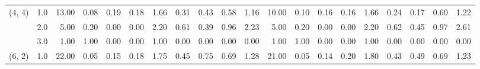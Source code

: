\begin{tabular}{llrrrrrrrrrrrrrrrrrr}
(4, 4) & 1.0 &              13.00 &                     0.08 &                                 0.19 &                             0.18 &                           1.66 &                                               0.31 &                                            0.43 &                                            0.58 &                                        1.16 &              10.00 &                     0.10 &                                 0.16 &                             0.16 &                           1.66 &                                               0.24 &                                            0.17 &                                            0.60 &                                        1.22 \\
       & 2.0 &               5.00 &                     0.20 &                                 0.00 &                             0.00 &                           2.20 &                                               0.61 &                                            0.39 &                                            0.96 &                                        2.23 &               5.00 &                     0.20 &                                 0.00 &                             0.00 &                           2.20 &                                               0.62 &                                            0.45 &                                            0.97 &                                        2.61 \\
       & 3.0 &               1.00 &                     1.00 &                                 0.00 &                             0.00 &                           1.00 &                                               0.00 &                                            0.00 &                                            0.00 &                                        0.00 &               1.00 &                     1.00 &                                 0.00 &                             0.00 &                           1.00 &                                               0.00 &                                            0.00 &                                            0.00 &                                        0.00 \\
(6, 2) & 1.0 &              22.00 &                     0.05 &                                 0.15 &                             0.18 &                           1.75 &                                               0.45 &                                            0.75 &                                            0.69 &                                        1.28 &              21.00 &                     0.05 &                                 0.14 &                             0.20 &                           1.80 &                                               0.43 &                                            0.49 &                                            0.69 &                                        1.23 \\

\end{tabular}
